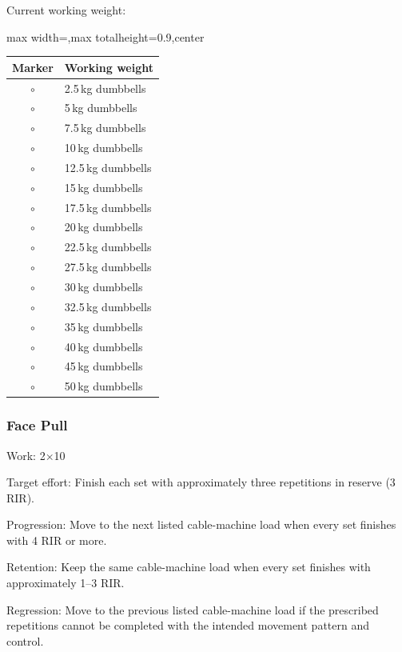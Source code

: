 \documentclass[11pt,a4paper]{article}
\newcommand{\tablearraystretch}{1.15}
\begin{document}
Current working weight:

\begin{center}
\renewcommand{\arraystretch}{\tablearraystretch}
\begin{adjustbox}{max width=\linewidth,max totalheight=0.9\textheight,center}
\begin{tabular}{cl}
\toprule
Marker & Working weight \\
\midrule
$\circ$ & 2.5\,kg dumbbells \\
$\circ$ & 5\,kg dumbbells \\
$\circ$ & 7.5\,kg dumbbells \\
$\circ$ & 10\,kg dumbbells \\
$\circ$ & 12.5\,kg dumbbells \\
$\circ$ & 15\,kg dumbbells \\
$\circ$ & 17.5\,kg dumbbells \\
$\circ$ & 20\,kg dumbbells \\
$\circ$ & 22.5\,kg dumbbells \\
$\circ$ & 27.5\,kg dumbbells \\
$\circ$ & 30\,kg dumbbells \\
$\circ$ & 32.5\,kg dumbbells \\
$\circ$ & 35\,kg dumbbells \\
$\circ$ & 40\,kg dumbbells \\
$\circ$ & 45\,kg dumbbells \\
$\circ$ & 50\,kg dumbbells \\
\bottomrule
\end{tabular}
\end{adjustbox}
\renewcommand{\arraystretch}{1}
\end{center}

\newpage
\subsubsection{Face Pull}

Work: 2$\times$10

Target effort: Finish each set with approximately three repetitions in reserve (3 RIR).

Progression: Move to the next listed cable-machine load when every set finishes with 4 RIR or more.

Retention: Keep the same cable-machine load when every set finishes with approximately 1--3 RIR.

Regression: Move to the previous listed cable-machine load if the prescribed repetitions cannot be completed with the intended movement pattern and control.
\end{document}
